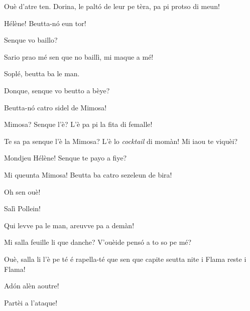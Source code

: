 \begin{drama}
\Bertaspeaks{} Ouè d'atre ten.  Dorina, le palt\'o de leur pe tèra, pa pi protso di meun!

\Marcospeaks Hélène! Beutta-n\'o eun tor!

\Helenespeaks Senque vo baillo?

\Federicospeaks{} Sario prao mé sen que no baillì, mi maque a mé! 


\Bertaspeaks{} Soplé, beutta ba le man.

\Helenespeaks Donque, senque vo beutto a bèye?

\Marcospeaks{} Beutta-n\'o catro sidel de Mimosa!

\Helenespeaks Mimosa? Senque l'è? L'è pa pi la fita di femalle!

\Michelspeaks {} Te sa pa senque l'è la Mimosa? L'è lo \textit{cocktail} di momàn! Mi iaou te viquèi?

\Bertaspeaks Mondjeu Hélène! Senque te payo a fiye?

\Federicospeaks Mi queunta Mimosa! Beutta ba catro sezeleun de bira! 

\Helenespeaks Oh sen ouè!

\scene[-- Si le man!]


\Djspeaks Salì Pollein!


\Djspeaks Qui levve pa le man, areuvve pa a demàn!



\Giuliospeaks{} Mi salla feuille li que danche? V'ouèide pens\'o a to so pe mé?

\Marcospeaks Ouè, salla li l'è pe té é rapella-té que sen que capite seutta nite i Flama reste i Flama!

\Giuliospeaks Ad\'on alèn aoutre!

\Marcospeaks Partèi a l'ataque!



\end{drama}
